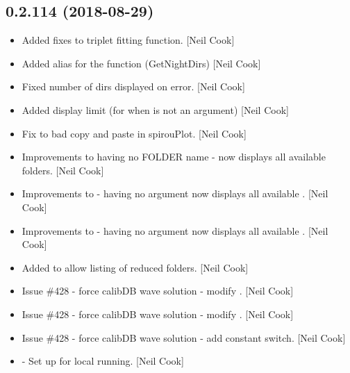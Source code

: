 \documentclass[a4paper,10pt,english]{report}
\begin{document}
\subsection{0.2.114 (2018-08-29)}
\label{\detokenize{misc/changelog:id346}}\begin{itemize}
\item {} 
Added fixes to triplet fitting function. {[}Neil Cook{]}

\item {} 
Added alias for the  function (GetNightDirs) {[}Neil Cook{]}

\item {} 
Fixed number of  dirs displayed on error. {[}Neil Cook{]}

\item {} 
Added  display limit (for when  is not an
argument) {[}Neil Cook{]}

\item {} 
Fix to bad copy and paste in spirouPlot. {[}Neil Cook{]}

\item {} 
Improvements to having no FOLDER name - now displays all available
folders. {[}Neil Cook{]}

\item {} 
Improvements to  - having no  argument now
displays all available . {[}Neil Cook{]}

\item {} 
Improvements to  - having no  argument now
displays all available . {[}Neil Cook{]}

\item {} 
Added  to allow listing of reduced folders.
{[}Neil Cook{]}

\item {} 
Issue \#428 - force calibDB wave solution - modify . {[}Neil
Cook{]}

\item {} 
Issue \#428 - force calibDB wave solution - modify .
{[}Neil Cook{]}

\item {} 
Issue \#428 - force calibDB wave solution - add constant switch. {[}Neil
Cook{]}

\item {} 
 - Set up for local running. {[}Neil Cook{]}

\end{itemize}
\end{document}

